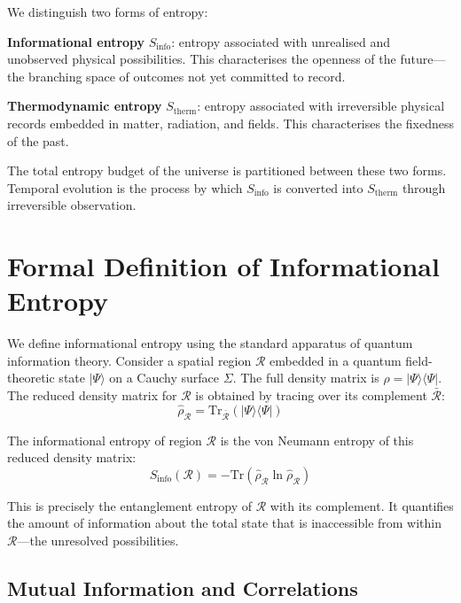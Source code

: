 \documentclass[12pt,a4paper]{article}
\begin{document}
We distinguish two forms of entropy:

\textbf{Informational entropy} $S_{\mathrm{info}}$: entropy associated with unrealised and unobserved physical possibilities. This characterises the openness of the future---the branching space of outcomes not yet committed to record.

\textbf{Thermodynamic entropy} $S_{\mathrm{therm}}$: entropy associated with irreversible physical records embedded in matter, radiation, and fields. This characterises the fixedness of the past.

The total entropy budget of the universe is partitioned between these two forms. Temporal evolution is the process by which $S_{\mathrm{info}}$ is converted into $S_{\mathrm{therm}}$ through irreversible observation.

\section{Formal Definition of Informational Entropy}
\label{sec:sinfo}

We define informational entropy using the standard apparatus of quantum information theory. Consider a spatial region $\mathcal{R}$ embedded in a quantum field-theoretic state $|\Psi\rangle$ on a Cauchy surface $\Sigma$. The full density matrix is $\hat{\rho} = |\Psi\rangle\langle\Psi|$. The reduced density matrix for $\mathcal{R}$ is obtained by tracing over its complement $\bar{\mathcal{R}}$:
\begin{equation}
    \hat{\rho}_{\mathcal{R}} = \mathrm{Tr}_{\bar{\mathcal{R}}}(|\Psi\rangle\langle\Psi|)
\end{equation}

The informational entropy of region $\mathcal{R}$ is the von Neumann entropy of this reduced density matrix:
\begin{equation}
    S_{\mathrm{info}}(\mathcal{R}) = -\mathrm{Tr}\!\left(\hat{\rho}_{\mathcal{R}} \ln \hat{\rho}_{\mathcal{R}}\right)
    \label{eq:sinfo}
\end{equation}

This is precisely the entanglement entropy of $\mathcal{R}$ with its complement. It quantifies the amount of information about the total state that is inaccessible from within $\mathcal{R}$---the unresolved possibilities.

\subsection{Mutual Information and Correlations}
\end{document}
